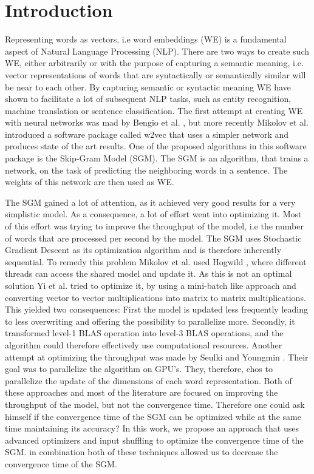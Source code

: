 \chapter{Introduction}\label{chap:introduction}

Representing words as vectors, i.e word embeddings (WE) is a fundamental aspect of Natural Language Processing (NLP). There are two ways to create such WE, either arbitrarily or with the purpose of capturing a semantic meaning, i.e. vector representations of words that are syntactically or semantically similar will be near to each other. By capturing semantic or syntactic meaning WE have shown to facilitate a lot of subsequent NLP tasks, such as entity recognition, machine translation or sentence classification.  The first attempt at creating WE with neural networks was mad by Bengio et al. \cite{bengio}, but more recently Mikolov et al. \cite{mikolov} introduced a software package called w2vec that uses a simpler network and produces state of the art results. One of the proposed algorithms in this software package is the Skip-Gram Model (SGM). The SGM is an algorithm, that trains a network, on the task of predicting the neighboring words in a sentence. The weights of this network are then used as WE. 

The SGM gained a lot of attention, as it achieved very good results for a very simplistic model. As a consequence, a lot of effort went into optimizing it. Most of this effort was trying to improve the throughput of the model, i.e the number of words that are processed per second by the model. The SGM uses Stochastic Gradient Descent as its optimization algorithm and is therefore inherently sequential. To remedy this problem Mikolov et al. used Hogwild \cite{hogwild}, where different threads can access the shared model and update it. As this is not an optimal solution Yi et al. \cite{intel} tried to optimize it, by using a mini-batch like approach and converting vector to vector multiplications into matrix to matrix multiplications. This yielded two consequences: First the model is updated less frequently leading to less overwriting and offering the possibility to parallelize more. Secondly, it transformed level-1 BLAS operation into level-3 BLAS operations, and the algorithm could therefore effectively use computational resources. Another attempt at optimizing the throughput was made by Seulki and Youngmin \cite{gpu}. Their goal was to parallelize the algorithm on GPU's. They, therefore, chos to parallelize the update of the dimensions of each word representation. Both of these approaches and most of the literature are focused on improving the throughput of the model, but not the convergence time.  Therefore one could ask himself if the convergence time of the SGM can be optimized while at the same time maintaining its accuracy? In this work, we propose an approach that uses advanced optimizers and input shuffling to optimize the convergence time of the SGM. in combination both of these techniques allowed us to decrease the convergence time of the SGM.

